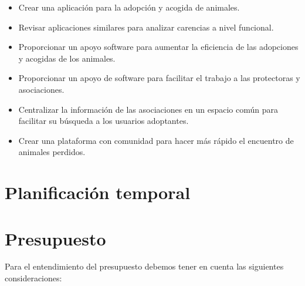 \begin{itemize}
	\item Crear una aplicación para la adopción y acogida de animales. %
	\item Revisar aplicaciones similares para analizar carencias a nivel funcional. %
	\item Proporcionar un apoyo software para aumentar la eficiencia de las adopciones y acogidas de los animales. %
	\item Proporcionar un apoyo de software para facilitar el trabajo a las protectoras y asociaciones.
	\item Centralizar la información de las asociaciones en un espacio común para facilitar su búsqueda a los usuarios adoptantes.
	\item Crear una plataforma con comunidad para hacer más rápido el encuentro de animales perdidos.
	
\end{itemize}

\section{Planificación temporal}

\section{Presupuesto}

Para el entendimiento del presupuesto debemos tener en cuenta las siguientes consideraciones:

